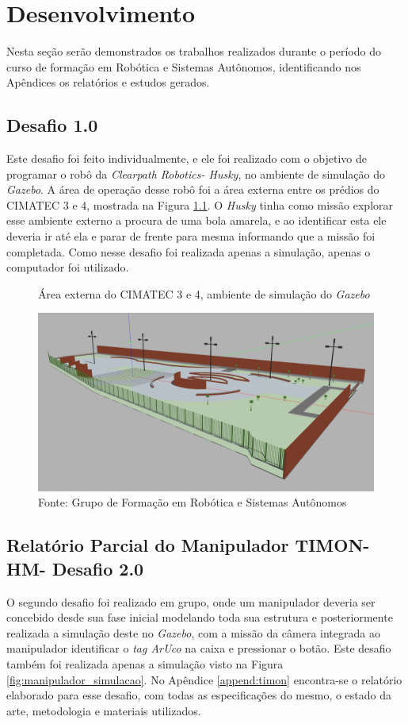 \chapter{Desenvolvimento}
\label{chap:desenvolvimento}

Nesta seção serão demonstrados os trabalhos realizados durante o período do curso de formação em Robótica e Sistemas Autônomos, identificando nos Apêndices os relatórios e estudos gerados. 


\section{Desafio 1.0 }
\label{sec:desafio_1}
Este desafio foi feito individualmente, e ele foi realizado com o objetivo de programar o robô da \textit{Clearpath Robotics- Husky}, no ambiente de simulação do \textit{Gazebo}. A área de operação desse robô foi a área externa entre os prédios do CIMATEC 3 e 4, mostrada na Figura \ref{fig:cimatec3_4}. O \textit{Husky} tinha como missão explorar esse ambiente externo a procura de uma bola amarela, e ao identificar esta ele deveria ir até ela e parar de frente para mesma informando que a missão foi completada. Como nesse desafio foi realizada apenas a simulação, apenas o computador foi utilizado.  


\begin{figure}[H]
    \caption{Área externa do CIMATEC 3 e 4, ambiente de simulação do \textit{Gazebo}}
    \centering
    \includegraphics[width= \textwidth]{Figures/cimatec4.png}
    \caption*{Fonte: Grupo de Formação em Robótica e Sistemas Autônomos}
    \label{fig:cimatec3_4}
\end{figure}



\section{Relatório Parcial do Manipulador TIMON-HM- Desafio 2.0 }
\label{sec:desafio_2}
O segundo desafio foi realizado em grupo, onde um manipulador deveria ser concebido desde sua fase inicial modelando toda sua estrutura e posteriormente realizada a simulação deste no \textit{Gazebo}, com a missão da câmera integrada ao manipulador identificar o \textit{tag ArUco} na caixa e pressionar o botão. Este desafio também foi realizada apenas a simulação visto na Figura \ref{fig:manipulador_simulacao}. No Apêndice \ref{append:timon} encontra-se o relatório elaborado para esse desafio, com todas as especificações do mesmo, o estado da arte, metodologia e materiais utilizados.


